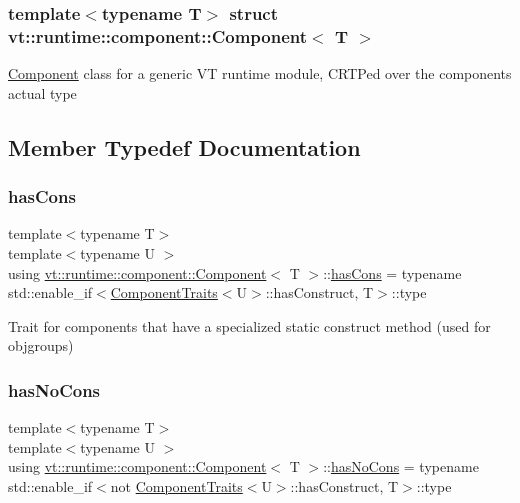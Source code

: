\subsubsection*{template$<$typename T$>$\newline
struct vt\+::runtime\+::component\+::\+Component$<$ T $>$}

{\ttfamily \hyperlink{structvt_1_1runtime_1_1component_1_1_component}{Component}} class for a generic VT runtime module, C\+R\+TP\textquotesingle{}ed over the component\textquotesingle{}s actual type 

\subsection{Member Typedef Documentation}
\mbox{\label{structvt_1_1runtime_1_1component_1_1_component_aca5f3a7c1db697b6d0ba70de7ff8b887}} 
\subsubsection{\texorpdfstring{has\+Cons}{hasCons}}
{\footnotesize\ttfamily template$<$typename T$>$ \\
template$<$typename U $>$ \\
using \hyperlink{structvt_1_1runtime_1_1component_1_1_component}{vt\+::runtime\+::component\+::\+Component}$<$ T $>$\+::\hyperlink{structvt_1_1runtime_1_1component_1_1_component_aca5f3a7c1db697b6d0ba70de7ff8b887}{has\+Cons} =  typename std\+::enable\+\_\+if$<$\hyperlink{structvt_1_1runtime_1_1component_1_1_component_traits}{Component\+Traits}$<$U$>$\+::has\+Construct, T$>$\+::type}

Trait for components that have a specialized static construct method (used for objgroups) \mbox{\label{structvt_1_1runtime_1_1component_1_1_component_a389e53dbfc20013d66ef09d4f42c0a53}} 
\subsubsection{\texorpdfstring{has\+No\+Cons}{hasNoCons}}
{\footnotesize\ttfamily template$<$typename T$>$ \\
template$<$typename U $>$ \\
using \hyperlink{structvt_1_1runtime_1_1component_1_1_component}{vt\+::runtime\+::component\+::\+Component}$<$ T $>$\+::\hyperlink{structvt_1_1runtime_1_1component_1_1_component_a389e53dbfc20013d66ef09d4f42c0a53}{has\+No\+Cons} =  typename std\+::enable\+\_\+if$<$not \hyperlink{structvt_1_1runtime_1_1component_1_1_component_traits}{Component\+Traits}$<$U$>$\+::has\+Construct, T$>$\+::type}



